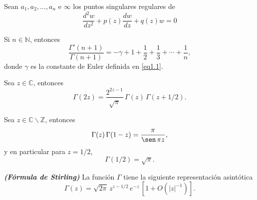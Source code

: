 \documentclass[main.tex]{subfiles}
\begin{document}
\begin{teorema}%
  Sean $a_{1},a_{2},\ldots,a_{n}$ e $\infty$ los puntos singulares regulares de
  \begin{equation}
    \label{eq1}
    \frac{d^2w}{dz^2}+p(z)\frac{dw}{dz}+q(z)w=0
  \end{equation}
\end{teorema}
\begin{prop}\label{p1.1} %
  Si $n\in\mathbb{N}$, entonces
  \begin{equation}
    \label{eq1.2}
    \frac{\Gamma'(n+1)}{\Gamma(n+1)}=-\gamma+1+\frac{1}{2}+\frac{1}{3}+\cdots+\frac{1}{n},
  \end{equation}
  donde $\gamma$ es la constante de Euler definida en \eqref{eq1.1}.
\end{prop}
\begin{prop}\label{p1.2} %
  Sea $z\in\mathbb{C}$, entonces
  \begin{equation}
    \label{eq1.3}
    \Gamma(2z)=\frac{2^{2z-1}}{\sqrt{\pi}}\,\Gamma(z)\,\Gamma\left(z+1/2\right).
  \end{equation}
\end{prop}
\begin{prop}\label{p1.3} %
  Sea $z\in\mathbb{C}\backslash\mathbb{Z}$, entonces
  \begin{equation}
    \label{eq1.4}
    \Gamma(z)\,\Gamma(1-z)=\frac{\pi}{\sen\,\pi z},
  \end{equation}
  y en particular para $z=1/2$,
  \[
    \Gamma(1/2)=\sqrt{\pi}.
  \]
\end{prop}
\begin{prop}{\emph{\textbf{(Fórmula de Stirling)}}}\label{p1.4} %
  La función $\Gamma$ tiene la siguiente representación asintótica
  \[
    \Gamma(z)=\sqrt{2\pi}\,z^{z-1/2}\,e^{-z}\,\left[1+O(|z|^{-1})\right].
  \]
\end{prop}
\end{document}
